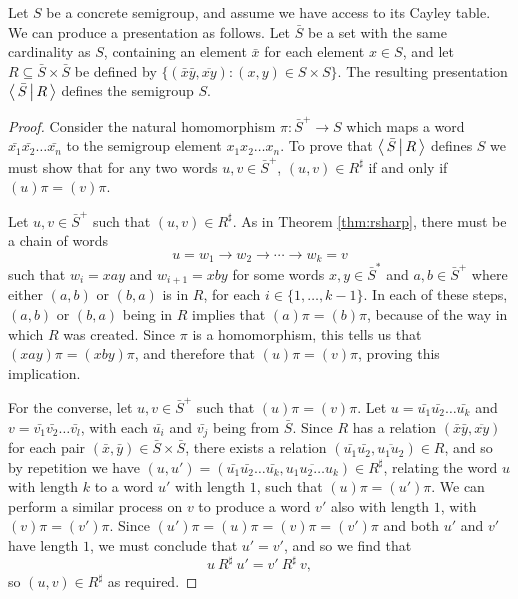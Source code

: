 \begin{method}
  \label{meth:trivial-presentation}
  Let $S$ be a concrete semigroup, and assume we have access to its Cayley
  table.  We can produce a presentation as follows.  Let $\bar S$ be a set with
  the same cardinality as $S$, containing an element $\bar{x}$ for each element
  $x \in S$, and let $R \subseteq \bar{S} \times \bar{S}$ be defined by
  $\{(\bar{x}\bar{y}, \overline{xy}) : (x,y) \in S \times S\}.$ The resulting
  presentation $\left\langle\,\bar{S}\,\middle|\,R\,\right\rangle$ defines the semigroup $S$.

  \begin{proof}
    Consider the natural homomorphism $\pi: \bar{S}^+ \to S$ which maps a word
    $\bar{x_1}\bar{x_2}\ldots \bar{x_n}$ to the semigroup element
    $x_1 x_2\ldots x_n$.  To prove that $\left\langle\,\bar{S}\,\middle|\,R\,\right\rangle$ defines $S$ we must
    show that for any two words $u, v \in \bar{S}^+$, $(u, v) \in R^\sharp$ if
    and only if $(u)\pi = (v)\pi$.

    Let $u,v \in \bar{S}^+$ such that $(u, v) \in R^\sharp$.  As in Theorem
    \ref{thm:rsharp}, there must be a chain of words
    $$u = w_1 \to w_2 \to \cdots \to w_k = v$$
    such that $w_i = xay$ and $w_{i+1} = xby$ for some words $x,y \in \bar{S}^*$ and
    $a,b \in \bar{S}^+$ where either $(a,b)$ or $(b,a)$ is in $R$, for each
    $i \in \{1, \ldots, k-1\}$.  In each of these steps, $(a,b)$ or $(b,a)$
    being in $R$ implies that $(a)\pi = (b)\pi$, because of the way in which $R$
    was created.  Since $\pi$ is a homomorphism, this tells us that
    $(xay)\pi = (xby)\pi$, and therefore that $(u)\pi = (v)\pi$, proving this
    implication.

    For the converse, let $u,v \in \bar{S}^+$ such that $(u)\pi = (v)\pi$.  Let
    $u = \bar{u_1}\bar{u_2}\ldots \bar{u_k}$ and $v = \bar{v_1}\bar{v_2}\ldots \bar{v_l}$, with each $\bar{u_i}$ and $\bar{v_j}$
    being from $\bar{S}$.  Since $R$ has a relation $(\bar{x}\bar{y}, \overline{xy})$ for each
    pair $(\bar{x},\bar{y}) \in \bar{S} \times \bar{S}$, there exists a relation
    $(\bar{u_1}\bar{u_2}, \overline{u_1u_2}) \in R$, and so by repetition we have
    $(u, u') = (\bar{u_1}\bar{u_2}\ldots \bar{u_k}, \overline{u_1u_2\ldots u_k}) \in R^\sharp$, relating the
    word $u$ with length $k$ to a word $u'$ with length $1$, such that
    $(u)\pi = (u')\pi$.  We can perform
    a similar process on $v$ to produce a word $v'$ also with length $1$, with
    $(v)\pi = (v')\pi$.
    Since $(u')\pi = (u)\pi = (v)\pi = (v')\pi$ and both $u'$ and $v'$
    have length $1$, we must conclude that $u' = v'$, and so we
    find that
    $$u ~R^\sharp~ u' = v' ~R^\sharp~ v,$$
    so $(u,v) \in R^\sharp$ as required.
  \end{proof}
\end{method}

